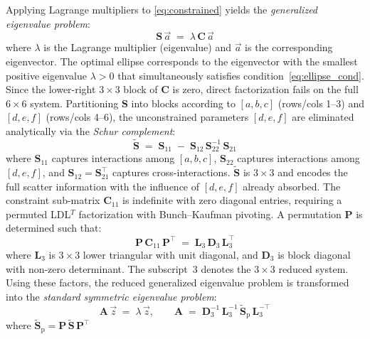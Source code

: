 \documentclass[colorlinks,upint,subscriptcorrection,varvw,hyphenate,balance,greek,russian,vietnamese,german]{asmeconf} %
\newcommand{\vect}[1]{\vec{#1}}
\begin{document}
Applying Lagrange multipliers to \eqref{eq:constrained} yields
the \emph{generalized eigenvalue problem}:
\begin{equation}
	\mathbf{S}\,\vect{a} \;=\;
	\lambda\,\mathbf{C}\,\vect{a}
	\label{eq:gen_eig}
\end{equation}
where $\lambda$ is the Lagrange multiplier (eigenvalue) and
$\vect{a}$ is the corresponding eigenvector.
The optimal ellipse corresponds to the eigenvector
with the smallest positive eigenvalue $\lambda > 0$
that simultaneously satisfies condition~\eqref{eq:ellipse_cond}.
Since the lower-right $3\times3$ block of $\mathbf{C}$ is zero,
direct factorization fails on the full $6\times6$ system.
Partitioning $\mathbf{S}$ into blocks according to
$[a,b,c]$ (rows/cols 1--3) and $[d,e,f]$ (rows/cols 4--6),
the unconstrained parameters $[d,e,f]$ are eliminated
analytically via the \emph{Schur complement}:
\begin{equation}
	\widetilde{\mathbf{S}} \;=\;
	\mathbf{S}_{11}
	\;-\;
	\mathbf{S}_{12}\,\mathbf{S}_{22}^{-1}\,\mathbf{S}_{21}
	\label{eq:schur}
\end{equation}
where $\mathbf{S}_{11}$ captures interactions among $[a,b,c]$,
$\mathbf{S}_{22}$ captures interactions among $[d,e,f]$,
and $\mathbf{S}_{12}=\mathbf{S}_{21}^\top$ captures cross-interactions.
$\widetilde{\mathbf{S}}$ is $3\times3$ and encodes the full
scatter information with the influence of $[d,e,f]$ already absorbed.
The constraint sub-matrix $\mathbf{C}_{11}$ is indefinite with
zero diagonal entries, requiring a permuted LDL$^T$ factorization
with Bunch--Kaufman pivoting. A permutation $\mathbf{P}$
is determined such that:
\begin{equation}
	\mathbf{P}\,\mathbf{C}_{11}\,\mathbf{P}^\top
	\;=\; \mathbf{L}_3\,\mathbf{D}_3\,\mathbf{L}_3^\top
	\label{eq:ldlt}
\end{equation}
where $\mathbf{L}_3$ is $3\times3$ lower triangular with unit diagonal,
and $\mathbf{D}_3$ is block diagonal with non-zero determinant.
The subscript~3 denotes the $3\times3$ reduced system.
Using these factors, the reduced generalized eigenvalue problem is
transformed into the \emph{standard symmetric eigenvalue problem}:
\begin{equation}
	\mathbf{A}\,\vect{z} \;=\; \lambda\,\vect{z},
	\qquad
	\mathbf{A} \;=\;
	\mathbf{D}_3^{-1}\,\mathbf{L}_3^{-1}\,
	\widetilde{\mathbf{S}}_{\mathrm{p}}\,
	\mathbf{L}_3^{-\top}
	\label{eq:standard_eig}
\end{equation}
where $\widetilde{\mathbf{S}}_{\mathrm{p}} =
\mathbf{P}\,\widetilde{\mathbf{S}}\,\mathbf{P}^\top$
\end{document}
